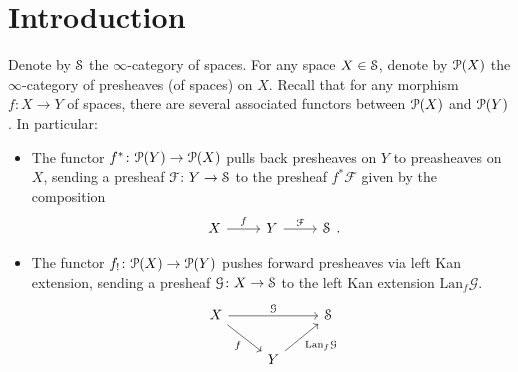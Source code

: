 \documentclass[main.tex]{subfiles}
\begin{document}
\section{Introduction}
\label{sec:introduction}

Denote by $\S$ the $\infty$-category of spaces. For any space $X \in \S$, denote by $\P(X)$ the $\infty$-category of presheaves (of spaces) on $X$. Recall that for any morphism $f\colon X \to Y$ of spaces, there are several associated functors between $\P(X)$ and $\P(Y)$. In particular:
\begin{itemize}
  \item The functor $f^{*}\colon \P(Y) \to \P(X)$ pulls back presheaves on $Y$ to preasheaves on $X$, sending a presheaf $\mathcal{F}\colon Y \to \S$ to the presheaf $f^{*}\mathcal{F}$ given by the composition
    \begin{equation*}
      \begin{tikzcd}
        X
        \arrow[r, "f"]
        & Y
        \arrow[r, "\mathcal{F}"]
        & \S
      \end{tikzcd}.
    \end{equation*}

  \item The functor $f_{!}\colon \P(X) \to \P(Y)$ pushes forward presheaves via left Kan extension, sending a presheaf $\mathcal{G}\colon X \to \S$ to the left Kan extension $\mathrm{Lan}_{f}\mathcal{G}$.
    \begin{equation*}
      \begin{tikzcd}
        X
        \arrow[rr, "\mathcal{G}"]
        \arrow[dr, swap, "f"]
        && \S
        \\
        & Y
        \arrow[ur, swap, "\mathrm{Lan}_{f}\mathcal{G}"]
      \end{tikzcd}
    \end{equation*}
\end{itemize}
\end{document}

